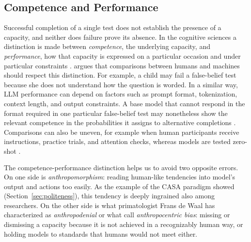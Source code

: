 \subsection{Competence and Performance} \label{sec:competence}
Successful completion of a single test does not establish the presence of a capacity, and neither does failure prove its absence. In the cognitive sciences a distinction is made between \emph{competence}, the underlying capacity, and \emph{performance}, how that capacity is expressed on a particular occasion and under particular constraints \citep{chomsky1965aspects}. \citet{firestone2020perf} argues that comparisons between humans and machines should respect this distinction. For example, a child may fail a false-belief test because she does not understand how the question is worded. In a similar way, LLM performance can depend on factors such as prompt format, tokenization, context length, and output constraints. A base model that cannot respond in the format required in one particular false-belief test may nonetheless show the relevant competence in the probabilities it assigns to alternative completions \citep{kouwenhoven2026traces}. Comparisons can also be uneven, for example when human participants receive instructions, practice trials, and attention checks, whereas models are tested zero-shot \citep{lampinen2024can}.

The competence-performance distinction helps us to avoid two opposite errors. On one side is \emph{anthropomorphism}: reading human-like tendencies into model's output and actions too easily. As the example of the CASA paradigm showed (Section~\ref{sec:politeness}), this tendency is deeply ingrained also among researchers. On the other side is what primatologist Frans de Waal has characterized as \emph{anthropodenial} \citep{deWaal1999anthropo} or what \citet{milliere2026anth} call \emph{anthropocentric bias}: missing or dismissing a capacity because it is not achieved in a recognizably human way, or holding models to standards that humans would not meet either. 


